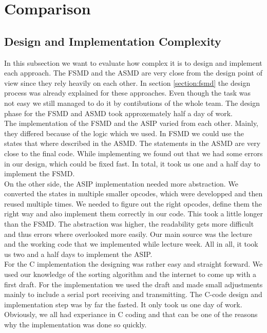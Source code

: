 \documentclass[conference]{IEEEtran}
\begin{document}
\section{Comparison}

\subsection{Design and Implementation Complexity}
In this subsection we want to evaluate how complex it is to design and implement each approach. The FSMD and the ASMD are very close from the design point of view since they rely heavily on each other. In section \autoref{section:fsmd} the design process was already explained for these approaches. Even though the task was not easy we still managed to do it by contibutions of the whole team. The design phase for the FSMD and ASMD took approxemately half a day of work. \\
The implementation of the FSMD and the ASIP varied from each other. Mainly, they differed because of the logic which we used. In FSMD we could use the states that where described in the ASMD. The statements in the ASMD are very close to the final code. While implementing we found out that we had some errors in our design, which could be fixed fast. In total, it took us one and a half day to implement the FSMD.\\
On the other side, the ASIP implementation needed more abstraction. We converted the states in multiple smaller opcodes, which were developped and then reused multiple times. We needed to figure out the right opcodes, define them the right way and also implement them correctly in our code. This took a little longer than the FSMD. The abstraction was higher, the readability gets more difficult and thus errors where overlooked more easily. Our main source was the lecture and the working code that we implemented while lecture week. All in all, it took us two and a half days to implement the ASIP. \\
For the C implementation the designing was rather easy and straight forward. We used our knowledge of the sorting algorithm and the internet to come up with a first draft. For the implementation we used the draft and made small adjustments mainly to include a serial port receiving and transmitting. The C-code design and implementation step was by far the fasted. It only took us one day of work. Obviously, we all had experiance in C coding and that can be one of the reasons why the implementation was done so quickly. \\
\end{document}
